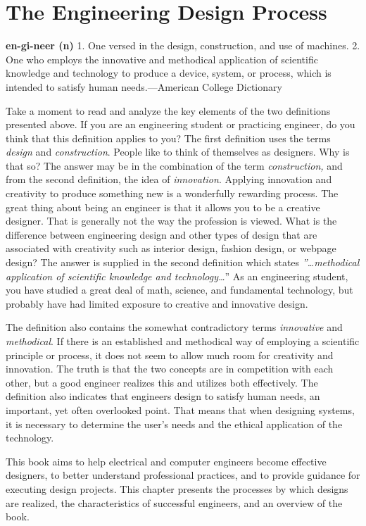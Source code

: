 \section{The Engineering Design
Process}\label{the-engineering-design-process}

\textbf{en-gi-neer (n)} 1. One versed in the design, construction, and
use of machines. 2. One who employs the innovative and methodical
application of scientific knowledge and technology to produce a device,
system, or process, which is intended to satisfy human needs.---American
College Dictionary

Take a moment to read and analyze the key elements of the two
definitions presented above. If you are an engineering student or
practicing engineer, do you think that this definition applies to you?
The first definition uses the terms \emph{design} and
\emph{construction}. People like to think of themselves as designers.
Why is that so? The answer may be in the combination of the term
\emph{construction,} and from the second definition, the idea of
\emph{innovation}. Applying innovation and creativity to produce
something new is a wonderfully rewarding process. The great thing about
being an engineer is that it allows you to be a creative designer. That
is generally not the way the profession is viewed. What is the
difference between engineering design and other types of design that are
associated with creativity such as interior design, fashion design, or
webpage design? The answer is supplied in the second definition which
states \emph{''\ldots methodical application of scientific knowledge and
technology\ldots{}}'' As an engineering student, you have studied a
great deal of math, science, and fundamental technology, but probably
have had limited exposure to creative and innovative design.

The definition also contains the somewhat contradictory terms
\emph{innovative} and \emph{methodical}. If there is an established and
methodical way of employing a scientific principle or process, it does
not seem to allow much room for creativity and innovation. The truth is
that the two concepts are in competition with each other, but a good
engineer realizes this and utilizes both effectively. The definition
also indicates that engineers design to satisfy human needs, an
important, yet often overlooked point. That means that when designing
systems, it is necessary to determine the user's needs and the ethical
application of the technology.

This book aims to help electrical and computer engineers become
effective designers, to better understand professional practices, and to
provide guidance for executing design projects. This chapter presents
the processes by which designs are realized, the characteristics of
successful engineers, and an overview of the book.

